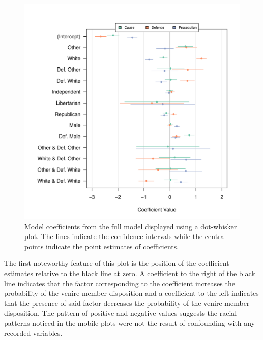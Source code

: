 \documentclass[12pt]{article}
\begin{document}
\begin{figure}[h!]
  \centering
  \includegraphics[scale=0.7]{AllModCoef}
  \caption[All Model Coefficients]{\footnotesize Model coefficients from the full model displayed using
    a dot-whisker plot. The lines indicate the confidence intervals while the central points indicate the point estimates of
    coefficients.}
  \label{fig:modallcoef}
\end{figure}


The first noteworthy feature of this plot is the position of the coefficient estimates relative to the black line at zero. A coefficient to the right of the black line indicates that the factor corresponding to the coefficient increases the probability of the venire member disposition and a coefficient to the left indicates that the presence of said factor decreases the probability of the venire member disposition. The pattern of positive and negative values suggests the racial patterns noticed in the mobile plots were not the result of confounding with any recorded variables.
\end{document}
